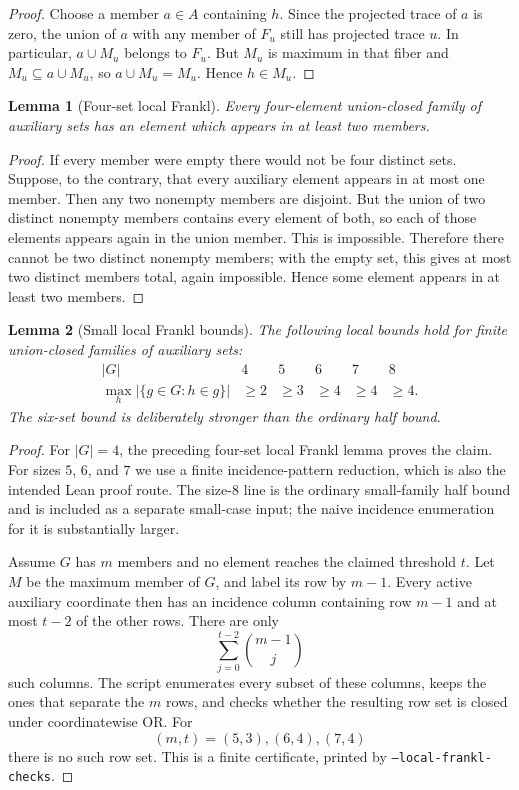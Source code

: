 \documentclass[11pt]{article}
\newtheorem{lemma}{Lemma}
\begin{document}
\begin{proof}
Choose a member $a\in A$ containing $h$.  Since the projected trace of $a$ is
zero, the union of $a$ with any member of $F_u$ still has projected trace
$u$.  In particular, $a\cup M_u$ belongs to $F_u$.  But $M_u$ is maximum in
that fiber and $M_u\subseteq a\cup M_u$, so $a\cup M_u=M_u$.  Hence
$h\in M_u$.
\end{proof}

\begin{lemma}[Four-set local Frankl]
Every four-element union-closed family of auxiliary sets has an element which
appears in at least two members.
\end{lemma}

\begin{proof}
If every member were empty there would not be four distinct sets.  Suppose, to
the contrary, that every auxiliary element appears in at most one member.
Then any two nonempty members are disjoint.  But the union of two distinct
nonempty members contains every element of both, so each of those elements
appears again in the union member.  This is impossible.  Therefore there
cannot be two distinct nonempty members; with the empty set, this gives at
most two distinct members total, again impossible.  Hence some element appears
in at least two members.
\end{proof}

\begin{lemma}[Small local Frankl bounds]
The following local bounds hold for finite union-closed families of auxiliary
sets:
\[
\begin{array}{c|ccccc}
|G| & 4 & 5 & 6 & 7 & 8\\ \hline
\max_h |\{g\in G:h\in g\}| & \geq2 & \geq3 & \geq4 & \geq4 & \geq4.
\end{array}
\]
The six-set bound is deliberately stronger than the ordinary half bound.
\end{lemma}

\begin{proof}
For $|G|=4$, the preceding four-set local Frankl lemma proves the claim.  For
sizes $5$, $6$, and $7$ we use a finite incidence-pattern reduction, which is
also the intended Lean proof route.  The size-$8$ line is the ordinary
small-family half bound and is included as a separate small-case input; the
naive incidence enumeration for it is substantially larger.

Assume $G$ has $m$ members and no element reaches the claimed threshold $t$.
Let $M$ be the maximum member of $G$, and label its row by $m-1$.  Every
active auxiliary coordinate then has an incidence column containing row
$m-1$ and at most $t-2$ of the other rows.  There are only
\[
  \sum_{j=0}^{t-2}\binom{m-1}{j}
\]
such columns.  The script enumerates every subset of these columns, keeps the
ones that separate the $m$ rows, and checks whether the resulting row set is
closed under coordinatewise OR.  For
\[
  (m,t)=(5,3),(6,4),(7,4)
\]
there is no such row set.  This is a finite certificate, printed by
\texttt{--local-frankl-checks}.
\end{proof}
\end{document}

